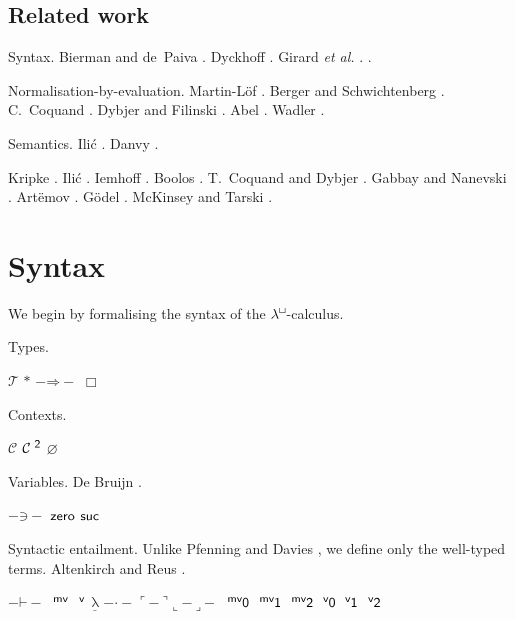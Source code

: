 \documentclass{entcs}
\newcommand{\lambdabox}{\lambda^{\mkern-1mu\sq\mkern-2mu}}
\renewcommand{\:}{\mathrel{:}}
\renewcommand{\;}{\mathbin{;}}
\newcommand{\binop}[1]{-\mathord{#1}-}
\newcommand{\tsf}[1]{\textsf{\upshape{#1}}}
\newcommand{\stsf}[1]{\tsf{\small{#1}}}
\newcommand{\T}{\mathcal{T}}
\newcommand{\R}{\Rightarrow}
\newcommand{\sq}{\Box}
\newcommand{\C}{\mathcal{C}}
\newcommand{\CZ}{\mathcal{C}^{\stsf{2}}}
\renewcommand{\O}{\varnothing}
\newcommand{\zero}{\operatorname{\tsf{zero}}}
\newcommand{\suc}{\operatorname{\tsf{suc}}}
\renewcommand{\e}{\mathrel{\vdash}}
\newcommand{\mvar}{\operatorname{^{\stsf{mv}}}}
\newcommand{\var}{\operatorname{^{\stsf{v}}}}
\newcommand{\lam}{\operatorname{\underline{\lambda}}}
\newcommand{\app}{\mathrel{\cdot}}
\newcommand{\quo}[1]{\mathord{\ulcorner}{#1}\mathord{\urcorner}}
\newcommand{\unquo}[2]{\mathord{\llcorner}{#1}\mathord{\lrcorner}{#2}}
\newcommand{\mvO}{\operatorname{^{\stsf{mv}\mkern-1mu}\tsf{0}}}
\newcommand{\mvI}{\operatorname{^{\stsf{mv}\mkern-1mu}\tsf{1}}}
\newcommand{\mvZ}{\operatorname{^{\stsf{mv}\mkern-1mu}\tsf{2}}}
\newcommand{\vO}{\operatorname{^{\stsf{v}\mkern-1mu}\tsf{0}}}
\newcommand{\vI}{\operatorname{^{\stsf{v}\mkern-1mu}\tsf{1}}}
\newcommand{\vZ}{\operatorname{^{\stsf{v}\mkern-1mu}\tsf{2}}}
\begin{document}
\subsection*{Related work}

Syntax.  Bierman and de~Paiva \cite{BiermanP00}.  Dyckhoff \cite{Dyckhoff16}.  Girard \emph{et al.} \cite{GirardTL89}.  \cite{Kovacs17}.

Normalisation-by-evaluation.  Martin-L\"{o}f \cite{MartinLof75}.  Berger and Schwichtenberg \cite{BergerS91}.  C.~Coquand \cite{Coquand93}.  Dybjer and Filinski \cite{DybjerF02}.  Abel \cite{Abel13}.  Wadler \cite{Wadler15}.

Semantics.  Ili\'{c} \cite{Ilic13}.  Danvy \cite{Danvy96}.

Kripke \cite{Kripke65}.  Ili\'{c} \cite{Ilic13}.  Iemhoff \cite{Iemhoff01}.  Boolos \cite{Boolos94}.  T.~Coquand and Dybjer \cite{CoquandD97}.  Gabbay and Nanevski \cite{GabbayN13}.  Art\"{e}mov \cite{Artemov01}.  G\"{o}del \cite{Godel33}.  McKinsey and Tarski \cite{McKinseyT48}.




\section{Syntax}

We begin by formalising the syntax of the $\lambdabox$-calculus.


\begin{definition}
  Types.

$\T$ $\ast$ $\binop{\R}$ $\sq$
\end{definition}


\begin{definition}
  Contexts.

$\C$ $\CZ$ $\O$
\end{definition}


\begin{definition}
  Variables.  De Bruijn \cite{DeBruijn72}.

$\binop{\ni}$ $\zero$ $\suc$
\end{definition}


\begin{definition}
  Syntactic entailment.  Unlike Pfenning and Davies \cite{PfenningD01}, we define only the well-typed terms.  Altenkirch and Reus \cite{AltenkirchR99}.



$\binop{\e}$ $\mvar$ $\var$ $\lam$ $\binop{\app}$ $\quo{-}$ $\unquo{-}{-}$ $\mvO$ $\mvI$ $\mvZ$ $\vO$ $\vI$ $\vZ$
\end{definition}
\end{document}
